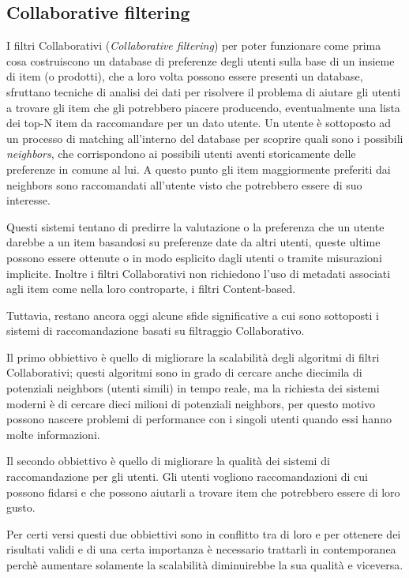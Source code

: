 \subsection{Collaborative filtering}
I filtri Collaborativi (\textit{Collaborative filtering}) per poter funzionare come prima cosa costruiscono un database di preferenze 
degli utenti sulla base di un insieme di item (o prodotti), che a loro volta possono essere presenti un database,
sfruttano tecniche di analisi dei dati per risolvere il problema di aiutare gli utenti a trovare gli item che gli potrebbero piacere 
producendo, eventualmente una lista dei top-N item da raccomandare per un dato utente.
Un utente è sottoposto ad un processo di matching all'interno del database per scoprire quali sono i possibili \textit{neighbors},
che corrispondono ai possibili utenti aventi storicamente delle preferenze in comune al lui. A questo punto gli item maggiormente 
preferiti dai neighbors sono raccomandati all'utente visto che potrebbero essere di suo interesse. 

Questi sistemi tentano di predirre la valutazione o la preferenza che un utente darebbe a un item basandosi su preferenze date da altri 
utenti, queste ultime possono essere ottenute o in modo esplicito dagli utenti o tramite misurazioni implicite. 
Inoltre i filtri Collaborativi non richiedono l'uso di metadati associati agli item come nella loro controparte, i filtri Content-based. 

Tuttavia, restano ancora oggi alcune sfide significative a cui sono sottoposti i sistemi di raccomandazione basati su 
filtraggio Collaborativo.
\begin{description}
	\item Il primo obbiettivo è quello di migliorare la scalabilità degli algoritmi di filtri Collaborativi; questi algoritmi sono in grado di cercare
	anche diecimila di potenziali neighbors (utenti simili) in tempo reale, ma la richiesta dei sistemi moderni è di cercare dieci milioni di 
	potenziali neighbors, per questo motivo possono nascere problemi di performance con i singoli utenti quando essi hanno molte informazioni.
	\item Il secondo obbiettivo è quello di migliorare la qualità dei sistemi di raccomandazione per gli utenti. Gli utenti vogliono
	raccomandazioni di cui possono fidarsi e che possono aiutarli a trovare item che potrebbero essere di loro gusto.
\end{description}
Per certi versi questi due obbiettivi sono in conflitto tra di loro e per ottenere dei risultati validi e di una certa importanza è 
necessario trattarli in contemporanea perchè aumentare solamente la scalabilità diminuirebbe la sua qualità e viceversa. 
\cite{item-based-collaborative-filtering} 

